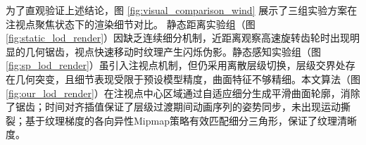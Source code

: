 


为了直观验证上述结论，图 \ref{fig:visual_comparison_wind} 展示了三组实验方案在注视点聚焦状态下的渲染细节对比。
静态距离实验组（图 \ref{fig:static_lod_render}）因缺乏连续细分机制，近距离观察高速旋转齿轮时出现明显的几何锯齿，视点快速移动时纹理产生闪烁伪影。静态感知实验组（图 \ref{fig:sp_lod_render}）虽引入注视点机制，但仍采用离散层级切换，层级交界处存在几何突变，且细节表现受限于预设模型精度，曲面特征不够精细。本文算法（图 \ref{fig:our_lod_render}）在注视点中心区域通过自适应细分生成平滑曲面轮廓，消除了锯齿；时间对齐插值保证了层级过渡期间动画序列的姿势同步，未出现运动撕裂；基于纹理梯度的各向异性Mipmap策略有效匹配细分三角形，保证了纹理清晰度。

